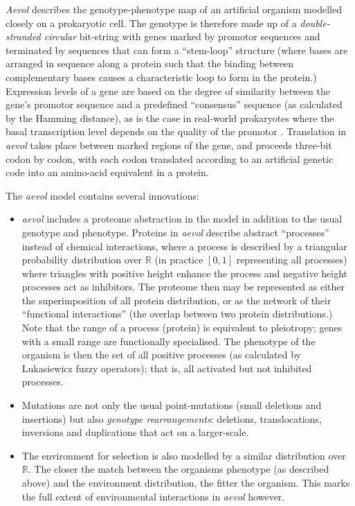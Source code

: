 \emph{Aevol} describes the genotype-phenotype map of an artificial organism modelled closely on a prokaryotic cell. The genotype is therefore made up of a \emph{double-stranded circular} bit-string with genes marked by promotor sequences and terminated by sequences that can form a ``stem-loop'' structure (where bases are arranged in sequence along a protein such that the binding between complementary bases causes a characteristic loop to form in the protein.) Expression levels of a gene are based on the degree of similarity between the gene's promotor sequence and a predefined ``consensus'' sequence (as calculated by the Hamming distance), as is the case in real-world prokaryotes where the basal transcription level depends on the quality of the promotor \parencite{Sanchez-Dehesa:2008uq}. Translation in \emph{aevol} takes place between marked regions of the gene, and proceeds three-bit codon by codon, with each codon translated according to an artificial genetic code into an amino-acid equivalent in a protein.

The \emph{aevol} model contains several innovations:

\begin{itemize}
	\item \emph{aevol} includes a proteome abstraction in the model in addition to the usual genotype and phenotype. Proteins in \emph{aevol} describe abstract ``processes'' instead of chemical interactions, where a process is described by a triangular probability distribution over $\mathbb{R}$ (in practice $[0,1]$ representing all processes) where triangles with positive height enhance the process and negative height processes act as inhibitors. The proteome then may be represented as either the superimposition of all protein distribution, or as the network of their ``functional interactions'' (the overlap between two protein distributions.) Note that the range of a process (protein) is equivalent to \gls{pleiotropy}; genes with a small range are functionally specialised. The phenotype of the organism is then the set of all positive processes (as calculated by Lukasiewicz fuzzy operators); that is, all activated but not inhibited processes.
	\item Mutations are not only the usual point-mutations (small deletions and insertions) but also \emph{genotype rearrangements}: deletions, translocations, inversions and duplications that act on a larger-scale.
	\item The environment for selection is also modelled by a similar distribution over $\mathbb{R}$. The closer the match between the organisms phenotype (as described above) and the environment distribution, the fitter the organism. This marks the full extent of environmental interactions in \emph{aevol} however. 
\end{itemize}

